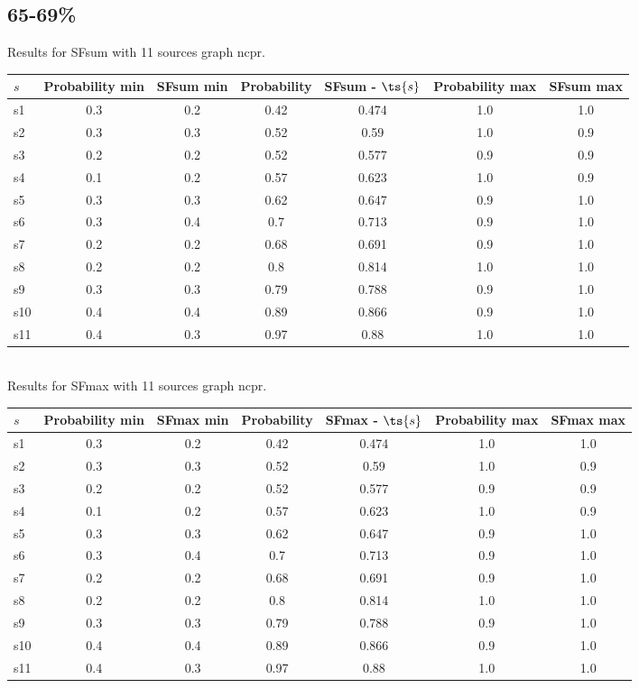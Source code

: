 \documentclass{article}
\begin{document}
\newpage

\subsection{65-69\%}

\noindent Results for SFsum with 11 sources graph ncpr.

\noindent\begin{tabular}{|l|c|c|c|c|c|c|}
\hline
$s$& Probability min & SFsum min & Probability & SFsum - $\ts{s}$ & Probability max & SFsum max\\
\hline
s1 &0.3 & 0.2 & 0.42 & 0.474 & 1.0 & 1.0\\
\hline
s2 &0.3 & 0.3 & 0.52 & 0.59 & 1.0 & 0.9\\
\hline
s3 &0.2 & 0.2 & 0.52 & 0.577 & 0.9 & 0.9\\
\hline
s4 &0.1 & 0.2 & 0.57 & 0.623 & 1.0 & 0.9\\
\hline
s5 &0.3 & 0.3 & 0.62 & 0.647 & 0.9 & 1.0\\
\hline
s6 &0.3 & 0.4 & 0.7 & 0.713 & 0.9 & 1.0\\
\hline
s7 &0.2 & 0.2 & 0.68 & 0.691 & 0.9 & 1.0\\
\hline
s8 &0.2 & 0.2 & 0.8 & 0.814 & 1.0 & 1.0\\
\hline
s9 &0.3 & 0.3 & 0.79 & 0.788 & 0.9 & 1.0\\
\hline
s10 &0.4 & 0.4 & 0.89 & 0.866 & 0.9 & 1.0\\
\hline
s11 &0.4 & 0.3 & 0.97 & 0.88 & 1.0 & 1.0\\
\hline
\end{tabular}\\

\noindent Results for SFmax with 11 sources graph ncpr.

\noindent\begin{tabular}{|l|c|c|c|c|c|c|}
\hline
$s$& Probability min & SFmax min & Probability & SFmax - $\ts{s}$ & Probability max & SFmax max\\
\hline
s1 &0.3 & 0.2 & 0.42 & 0.474 & 1.0 & 1.0\\
\hline
s2 &0.3 & 0.3 & 0.52 & 0.59 & 1.0 & 0.9\\
\hline
s3 &0.2 & 0.2 & 0.52 & 0.577 & 0.9 & 0.9\\
\hline
s4 &0.1 & 0.2 & 0.57 & 0.623 & 1.0 & 0.9\\
\hline
s5 &0.3 & 0.3 & 0.62 & 0.647 & 0.9 & 1.0\\
\hline
s6 &0.3 & 0.4 & 0.7 & 0.713 & 0.9 & 1.0\\
\hline
s7 &0.2 & 0.2 & 0.68 & 0.691 & 0.9 & 1.0\\
\hline
s8 &0.2 & 0.2 & 0.8 & 0.814 & 1.0 & 1.0\\
\hline
s9 &0.3 & 0.3 & 0.79 & 0.788 & 0.9 & 1.0\\
\hline
s10 &0.4 & 0.4 & 0.89 & 0.866 & 0.9 & 1.0\\
\hline
s11 &0.4 & 0.3 & 0.97 & 0.88 & 1.0 & 1.0\\
\hline
\end{tabular}\\
\end{document}
